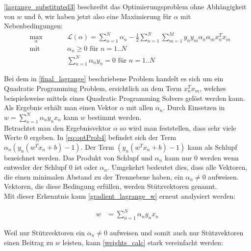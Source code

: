 \documentclass[a4paper,11pt,twoside]{scrreprt}
\newcommand{\Lagr}{\mathcal{L}}
\begin{document}
\autoref{lagrange_substituted3} beschreibt das Optimierungsproblem ohne Abhängigkeit von $w$ und $b$, wir haben jetzt also eine Maximierung für $\alpha$ mit Nebenbedingungen:
\begin{subequations} \label{final_lagrange}
	\begin{alignat}{2}
		&\!\max_{\alpha}        &\qquad&  	\Lagr(\alpha) = \sum_{n=1}^{N} \alpha_{n} - \frac{1}{2} \sum_{n=1}^{N} \sum_{m=1}^{M} y_{n} y_{m} \alpha_{n} \alpha_{m} x_{n}^{T} x_{m} \label{eq:optProb5}\\
		&\text{mit } &      & \alpha_{n} \geq 0 \text{ für } n=1..N \label{eq:constraint16}\\
		&       & & \sum_{n=1}^{N} \alpha_{n} y_{n} = 0\text{ für } n=1..N \label{eq:constraint17}
	\end{alignat}
\end{subequations}

Bei dem in \autoref{final_lagrange} beschriebene Problem handelt es sich um ein Quadratic Programming Problem, ersichtlich an dem Term $x_{n}^{T} x_{m}$, welches beispielsweise mittels eines Quadratic Programming Solvers gelöst werden kann. Als Ergebnis erhält man einen Vektor $\alpha$ mit allen $\alpha_{n}$. Durch Einsetzen in $w = \sum_{n=1}^{N} \alpha_{n} y_{n} x_{n}$ kann $w$ bestimmt werden. \\

Betrachtet man den Ergebnisvektor $\alpha$ so wird man feststellen, dass sehr viele Werte $0$ ergeben. In \autoref{eq:optProb4} befindet sich der Term $\alpha_{n} (y_n (w^{T} x_{n} + b)-1)$. Der Term $(y_n (w^{T} x_{n} + b)-1)$ kann als Schlupf bezeichnet werden. Das Produkt von Schlupf und $\alpha_{n}$ kann nur $0$ werden wenn entweder der Schlupf $0$ ist oder $\alpha_{n}$. Umgekehrt bedeutet dies, dass alle Vektoren, die einen minimalen Abstand zu der Trennebene haben, ein $\alpha_{n} \neq 0$ aufweisen. Vektoren, die diese Bedingung erfüllen, werden Stützvektoren genannt. \\


Mit dieser Erkenntnis kann \autoref{gradient_lagrange_w} erneut analysiert werden:

\begin{equation} \label{weights_calc}
	\begin{aligned}
		w &= \sum_{n=1}^{N} \alpha_{n} y_{n} x_{n}
	\end{aligned}
\end{equation}

Weil nur Stützvektoren ein $\alpha_{n} \neq 0$ aufweisen und somit auch nur Stützvektoren einen Beitrag zu $w$ leisten, kann \autoref{weights_calc} stark vereinfacht werden:
\end{document}
